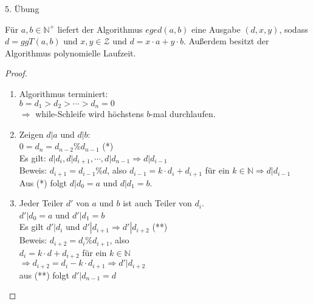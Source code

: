 \begin{section}{5. Übung}
 \begin{satz}
  Für $a,b \in \mathbb{N}^+$ liefert der Algorithmus $eged(a,b)$ eine Ausgabe $(d,x,y)$, sodass $d = ggT(a,b)$ und $x,y \in \mathcal{Z}$ und $d=x\cdot a + y\cdot b$. Außerdem besitzt der Algorithmus polynomielle Laufzeit.
 \end{satz}
 \begin{proof}
  \begin{enumerate}
   \item Algorithmus terminiert:\\
   $b = d_1 > d_2 > \cdots > d_n = 0$\\
   $\Rightarrow$ while-Schleife wird höchstens $b$-mal durchlaufen.
   \item Zeigen $d|a$ und $d|b$:\\
   $0 = d_n = d_{n-2} \% d_{n-1}$ (*)\\
   Es gilt: $d|d_i, d|d_{i+1}, \cdots , d|d_{n-1} \Rightarrow d|d_{i-1}$\\
   Beweis: $d_{i+1} = d_{i-1} \% d$, also $d_{i-1} = k\cdot d_i + d_{i+1}$ für ein $k \in \mathbb{N} \Rightarrow d|d_{i-1}$\\
   Aus (*) folgt $d|d_0 = a$ und $d|d_1 = b$.
   \item Jeder Teiler $d'$ von $a$ und $b$ ist auch Teiler von $d_i$.\\
   $d'|d_0 = a$ und $d'|d_1 = b$\\
   Es gilt $d'|d_i$ und $d'|d_{i+1} \Rightarrow d'|d_{i+2}$ (**)\\
   Beweis: $d_{i+2} = d_i \% d_{i+1}$, also \\
   $d_i = k \cdot d + d_{i+2}$ für ein $k \in \mathbb{N}$\\
   $\Rightarrow d_{i+2} = d_i -k\cdot d_{i+1} \Rightarrow d'|d_{i+2}$\\
   aus (**) folgt $d'|d_{n-1} = d$
   
  \end{enumerate}

 \end{proof}


\end{section}

